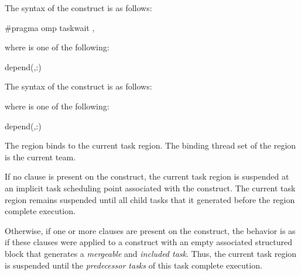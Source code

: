 \syntax
\begin{ccppspecific}
The syntax of the  construct is as follows:

\begin{ompcPragma}
#pragma omp taskwait \plc{[clause[ [},\plc{] clause] ... ] new-line}
\end{ompcPragma}

where  is one of the following:

\begin{indentedcodelist}
depend(\plc{[depend-modifier},\plc{]dependence-type }:)
\end{indentedcodelist}
\end{ccppspecific}

\begin{fortranspecific}
The syntax of the  construct is as follows:


where  is one of the following:

\begin{indentedcodelist}
depend(\plc{[depend-modifier},\plc{]dependence-type }:)
\end{indentedcodelist}

\end{fortranspecific}

\binding
The  region binds to the current task region. The binding thread set of the
 region is the current team.

\descr

If no  clause is present on the  construct, the
current task region is suspended at an implicit task scheduling point
associated with the construct. The current task region remains suspended until
all child tasks that it generated before the  region complete
execution.

Otherwise, if one or more  clauses are present on the
 construct, the behavior is as if these clauses were applied to
a  construct with an empty associated structured block that
generates a \emph{mergeable} and \emph{included task}. Thus, the current task region is
suspended until the \emph{predecessor tasks} of this task complete execution.

